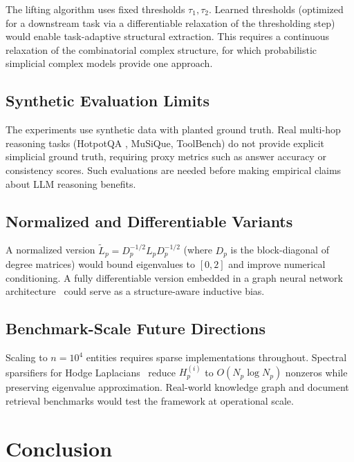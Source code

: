 \documentclass[11pt]{article}
\theoremstyle{definition}
\theoremstyle{remark}
\begin{document}
The lifting algorithm uses fixed thresholds $\tau_1,\tau_2$. Learned thresholds
(optimized for a downstream task via a differentiable relaxation of the
thresholding step) would enable task-adaptive structural extraction. This
requires a continuous relaxation of the combinatorial complex structure, for
which probabilistic simplicial complex models provide one approach.

\subsection{Synthetic Evaluation Limits}

The experiments use synthetic data with planted ground truth. Real multi-hop
reasoning tasks (HotpotQA \cite{yang2018}, MuSiQue, ToolBench) do not provide
explicit simplicial ground truth, requiring proxy metrics such as answer
accuracy or consistency scores. Such evaluations are needed before making
empirical claims about LLM reasoning benefits.

\subsection{Normalized and Differentiable Variants}

A normalized version $\tilde{L}_p = D_p^{-1/2}L_p D_p^{-1/2}$ (where $D_p$ is
the block-diagonal of degree matrices) would bound eigenvalues to $[0,2]$ and
improve numerical conditioning. A fully differentiable version embedded in a
graph neural network architecture~\cite{schaub2020} could serve as a
structure-aware inductive bias.

\subsection{Benchmark-Scale Future Directions}

Scaling to $n=10^4$ entities requires sparse implementations throughout.
Spectral sparsifiers for Hodge Laplacians~\cite{horak2013} reduce $H_p^{(i)}$
to $O(N_p\log N_p)$ nonzeros while preserving eigenvalue approximation.
Real-world knowledge graph and document retrieval benchmarks would test the
framework at operational scale.


\clearpage
\section{Conclusion}
\label{sec:conclusion}
\end{document}
